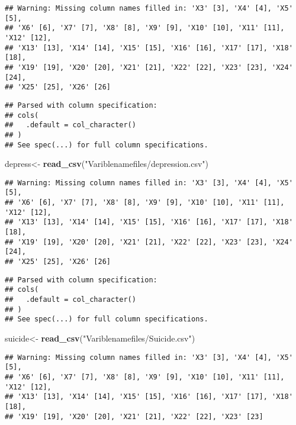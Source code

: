 \documentclass[]{article}
\newenvironment{Shaded}{\begin{snugshade}}{\end{snugshade}}
\newcommand{\KeywordTok}[1]{\textcolor[rgb]{0.13,0.29,0.53}{\textbf{#1}}}
\newcommand{\StringTok}[1]{\textcolor[rgb]{0.31,0.60,0.02}{#1}}
\newcommand{\NormalTok}[1]{#1}
\begin{document}
\begin{verbatim}
## Warning: Missing column names filled in: 'X3' [3], 'X4' [4], 'X5' [5],
## 'X6' [6], 'X7' [7], 'X8' [8], 'X9' [9], 'X10' [10], 'X11' [11], 'X12' [12],
## 'X13' [13], 'X14' [14], 'X15' [15], 'X16' [16], 'X17' [17], 'X18' [18],
## 'X19' [19], 'X20' [20], 'X21' [21], 'X22' [22], 'X23' [23], 'X24' [24],
## 'X25' [25], 'X26' [26]
\end{verbatim}

\begin{verbatim}
## Parsed with column specification:
## cols(
##   .default = col_character()
## )
## See spec(...) for full column specifications.
\end{verbatim}

\begin{Shaded}
\begin{Highlighting}[]
\NormalTok{depress<-}\StringTok{ }\KeywordTok{read_csv}\NormalTok{(}\StringTok{"Variblenamefiles/depression.csv"}\NormalTok{)}
\end{Highlighting}
\end{Shaded}

\begin{verbatim}
## Warning: Missing column names filled in: 'X3' [3], 'X4' [4], 'X5' [5],
## 'X6' [6], 'X7' [7], 'X8' [8], 'X9' [9], 'X10' [10], 'X11' [11], 'X12' [12],
## 'X13' [13], 'X14' [14], 'X15' [15], 'X16' [16], 'X17' [17], 'X18' [18],
## 'X19' [19], 'X20' [20], 'X21' [21], 'X22' [22], 'X23' [23], 'X24' [24],
## 'X25' [25], 'X26' [26]
\end{verbatim}

\begin{verbatim}
## Parsed with column specification:
## cols(
##   .default = col_character()
## )
## See spec(...) for full column specifications.
\end{verbatim}

\begin{Shaded}
\begin{Highlighting}[]
\NormalTok{suicide<-}\StringTok{ }\KeywordTok{read_csv}\NormalTok{(}\StringTok{"Variblenamefiles/Suicide.csv"}\NormalTok{)}
\end{Highlighting}
\end{Shaded}

\begin{verbatim}
## Warning: Missing column names filled in: 'X3' [3], 'X4' [4], 'X5' [5],
## 'X6' [6], 'X7' [7], 'X8' [8], 'X9' [9], 'X10' [10], 'X11' [11], 'X12' [12],
## 'X13' [13], 'X14' [14], 'X15' [15], 'X16' [16], 'X17' [17], 'X18' [18],
## 'X19' [19], 'X20' [20], 'X21' [21], 'X22' [22], 'X23' [23]
\end{verbatim}
\end{document}
